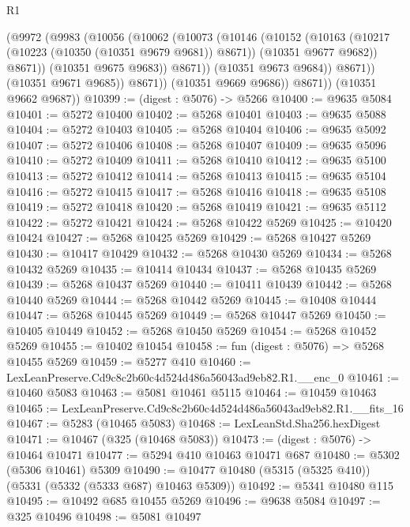 \begin{lexlean}{R1}
\begin{coremodule}
                    (@9972
                      (@9983
                        (@10056
                          (@10062
                            (@10073
                              (@10146
                                (@10152
                                  (@10163
                                    (@10217 (@10223 (@10350 (@10351 @9679 @9681)) @8671))
                                    (@10351 @9677 @9682))
                                  @8671))
                              (@10351 @9675 @9683))
                            @8671))
                        (@10351 @9673 @9684))
                      @8671))
                  (@10351 @9671 @9685))
                @8671))
            (@10351 @9669 @9686))
          @8671))
      (@10351 @9662 @9687))
@10399 := (digest : @5076) -> @5266
@10400 := @9635 @5084
@10401 := @5272 @10400
@10402 := @5268 @10401
@10403 := @9635 @5088
@10404 := @5272 @10403
@10405 := @5268 @10404
@10406 := @9635 @5092
@10407 := @5272 @10406
@10408 := @5268 @10407
@10409 := @9635 @5096
@10410 := @5272 @10409
@10411 := @5268 @10410
@10412 := @9635 @5100
@10413 := @5272 @10412
@10414 := @5268 @10413
@10415 := @9635 @5104
@10416 := @5272 @10415
@10417 := @5268 @10416
@10418 := @9635 @5108
@10419 := @5272 @10418
@10420 := @5268 @10419
@10421 := @9635 @5112
@10422 := @5272 @10421
@10424 := @5268 @10422 @5269
@10425 := @10420 @10424
@10427 := @5268 @10425 @5269
@10429 := @5268 @10427 @5269
@10430 := @10417 @10429
@10432 := @5268 @10430 @5269
@10434 := @5268 @10432 @5269
@10435 := @10414 @10434
@10437 := @5268 @10435 @5269
@10439 := @5268 @10437 @5269
@10440 := @10411 @10439
@10442 := @5268 @10440 @5269
@10444 := @5268 @10442 @5269
@10445 := @10408 @10444
@10447 := @5268 @10445 @5269
@10449 := @5268 @10447 @5269
@10450 := @10405 @10449
@10452 := @5268 @10450 @5269
@10454 := @5268 @10452 @5269
@10455 := @10402 @10454
@10458 := fun (digest : @5076) => @5268 @10455 @5269
@10459 := @5277 @410
@10460 := LexLeanPreserve.Cd9c8c2b60c4d524d486a56043ad9eb82.R1.__enc_0
@10461 := @10460 @5083
@10463 := @5081 @10461 @5115
@10464 := @10459 @10463
@10465 := LexLeanPreserve.Cd9c8c2b60c4d524d486a56043ad9eb82.R1.__fits_16
@10467 := @5283 (@10465 @5083)
@10468 := LexLeanStd.Sha256.hexDigest
@10471 := @10467 (@325 (@10468 @5083))
@10473 := (digest : @5076) -> @10464 @10471
@10477 := @5294 @410 @10463 @10471 @687
@10480 := @5302 (@5306 @10461) @5309
@10490 := @10477 @10480 (@5315 (@5325 @410)) (@5331 (@5332 (@5333 @687) @10463 @5309))
@10492 := @5341 @10480 @115
@10495 := @10492 @685 @10455 @5269
@10496 := @9638 @5084
@10497 := @325 @10496
@10498 := @5081 @10497

\end{coremodule}
\end{lexlean}
